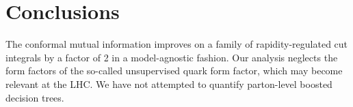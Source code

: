 \section{Conclusions}\label{sec:conclusions}

The conformal mutual information improves on a family of
rapidity-regulated cut integrals by a factor of 2 in a model-agnostic
fashion. Our analysis neglects the form factors of the so-called
unsupervised quark form factor, which may become relevant at the LHC. We
have not attempted to quantify parton-level boosted decision trees.

